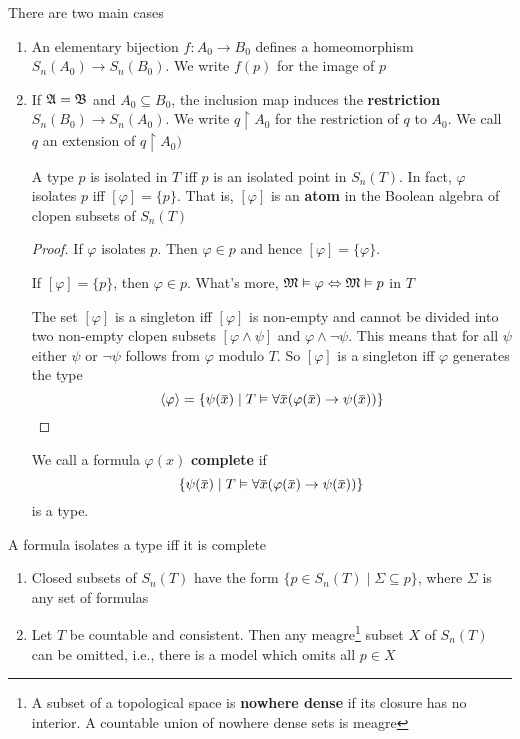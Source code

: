 \documentclass[11pt]{article}
\begin{document}
There are two main cases
\begin{enumerate}
\item An elementary bijection \(f:A_0\to B_0\) defines a homeomorphism
\(S_n(A_0)\to S_n(B_0)\). We write \(f(p)\) for the image of \(p\)
\item If \(\mathfrak{A}=\mathfrak{B}\) and \(A_0\subseteq B_0\), the inclusion map induces the
\textbf{restriction} \(S_n(B_0)\to S_n(A_0)\). We write \(q\restriction A_0\) for
the restriction of \(q\) to \(A_0\). We call \(q\) an extension of
\(q\restriction A_0)\)

\begin{lemma}[]
A type \(p\) is isolated in \(T\) iff \(p\) is an isolated point in
\(S_n(T)\). In fact, \(\varphi\) isolates \(p\) iff \([\varphi]=\{p\}\). That is, \([\varphi]\)
is an \textbf{atom} in the Boolean algebra of clopen subsets of \(S_n(T)\)
\end{lemma}

\begin{proof}
If \(\varphi\) isolates \(p\). Then \(\varphi\in p\) and hence \([\varphi]=\{\varphi\}\).

If \([\varphi]=\{p\}\), then \(\varphi\in p\). What's more,
\(\mathfrak{M}\vDash\varphi\Leftrightarrow \mathfrak{M}\vDash p\) in \(T\)


The set \([\varphi]\) is a singleton iff \([\varphi]\) is non-empty and cannot be
divided into two non-empty clopen subsets \([\varphi\wedge\psi]\) and
\(\varphi\wedge\neg\psi\). This means that for all \(\psi\) either \(\psi\) or
\(\neg\psi\) follows from \(\varphi\) modulo \(T\). So \([\varphi]\) is a singleton iff \(\varphi\)
generates the type
\begin{equation*}
\la\varphi\ra=\{\psi(\bbar{x})\mid T\vDash\forall\bbar{x}(\varphi(\bbar{x})\to\psi(\bbar{x}))\}
\end{equation*}
\end{proof}

We call a formula \(\varphi(x)\) \textbf{complete} if
\begin{equation*}
\{\psi(\bbar{x})\mid T\vDash\forall\bbar{x}(\varphi(\bbar{x})\to\psi(\bbar{x}))\}
\end{equation*}
is a type.
\end{enumerate}
\begin{corollary}
A formula isolates a type iff it is complete
\end{corollary}

\begin{exercise}
\label{ex4.2.2}
\begin{enumerate}
\item Closed subsets of \(S_n(T)\) have the form
\(\{p\in S_n(T)\mid\Sigma\subseteq p\}\), where \(\Sigma\) is any set of formulas
\item Let \(T\) be countable and consistent. Then any meagre\footnote{A subset of a topological space is \textbf{nowhere dense} if its closure has no interior. A countable union of nowhere dense sets is meagre} subset \(X\)
of \(S_n(T)\) can be omitted, i.e., there is a model which omits all
\(p\in X\)
\end{enumerate}
\end{exercise}
\end{document}
